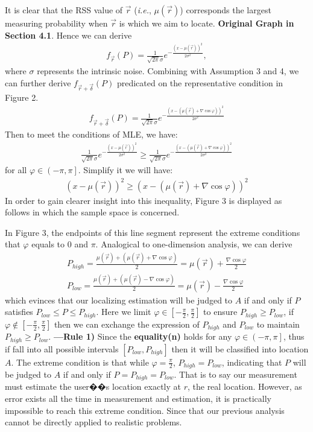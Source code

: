 \documentclass[journal]{IEEEtran}
\newcommand{\ie}{{\em i.e.}}
\begin{document}
It is clear that the RSS value of $\vec r$ (\ie, $\mu (\vec r)$) corresponds the largest measuring probability when $\vec r$ is which we aim to locate. \textbf{Original Graph in Section 4.1}. Hence we can derive
\begin{align}
{f_{\vec r}}(P) = \frac{1}{{\sqrt {2\pi } \sigma }}{e^{ - \frac{{{{(x - \mu (\vec r))}^2}}}{{2{\sigma ^2}}}}},
\end{align}
where $\sigma$ represents the intrinsic noise. Combining with Assumption 3 and 4, we can further derive ${f_{\vec r + \vec \delta }}(P)$ predicated on the representative condition in Figure 2.
\begin{align}
{f_{\vec r + \vec \delta }}(P) = \frac{1}{{\sqrt {2\pi } \sigma }}{e^{ - \frac{{{{(x - (\mu (\vec r) + \nabla \cos \varphi ))}^2}}}{{2{\sigma ^2}}}}}
\end{align}
Then to meet the conditions of MLE, we have:
\begin{align}
\frac{1}{{\sqrt {2\pi } \sigma }}{e^{ - \frac{{{{(x - \mu (\vec r))}^2}}}{{2{\sigma ^2}}}}} \ge \frac{1}{{\sqrt {2\pi } \sigma }}{e^{ - \frac{{{{(x - (\mu (\vec r) + \nabla \cos \varphi ))}^2}}}{{2{\sigma ^2}}}}}
\end{align}
for all $\varphi  \in \left( { - \pi ,\pi } \right]$. Simplify it we will have:
\begin{align}
{(x - \mu (\vec r))^2} \ge {(x - (\mu (\vec r) + \nabla \cos \varphi ))^2}
\end{align}
In order to gain clearer insight into this inequality, Figure 3 is displayed as follows in which the sample space is concerned.

In Figure 3, the endpoints of this line segment represent the extreme conditions that $\varphi$ equals to 0 and $\pi$. Analogical to one-dimension analysis, we can derive
\begin{align}
{P_{high}} = \frac{{\mu (\vec r) + (\mu (\vec r) + \nabla \cos \varphi )}}{2} = \mu (\vec r) + \frac{{\nabla \cos \varphi }}{2}\\
{P_{low}} = \frac{{\mu (\vec r) + (\mu (\vec r) - \nabla \cos \varphi )}}{2} = \mu (\vec r) - \frac{{\nabla \cos \varphi }}{2}
\end{align}
which evinces that our localizing estimation will be judged to $A$ if and only if $P$ satisfies ${P_{low}} \le P \le {P_{high}}$. Here we limit $\varphi  \in [ - \frac{\pi }{2},\frac{\pi }{2}]$ to ensure ${P_{high}} \ge {P_{low}}$, if $\varphi  \notin [ - \frac{\pi }{2},\frac{\pi }{2}]$ then we can exchange the expression of ${P_{high}}$ and ${P_{low}}$ to maintain ${P_{high}} \ge {P_{low}}$. \textbf{---Rule 1)} Since the \textbf{equality(n)} holds for any $\varphi  \in \left( { - \pi ,\pi } \right]$, thus if fall into all possible intervals $[{P_{low}},{P_{high}}]$ then it will be classified into location $A$. The extreme condition is that while $\varphi  = \frac{\pi }{2}$, ${P_{high}} = {P_{low}}$, indicating that $P$ will be judged to $A$ if and only if $P = {P_{high}} = {P_{low}}$. That is to say our measurement must estimate the user��s location exactly at $r$, the real location. However, as error exists all the time in measurement and estimation, it is practically impossible to reach this extreme condition. Since that our previous analysis cannot be directly applied to realistic problems.
\end{document}
